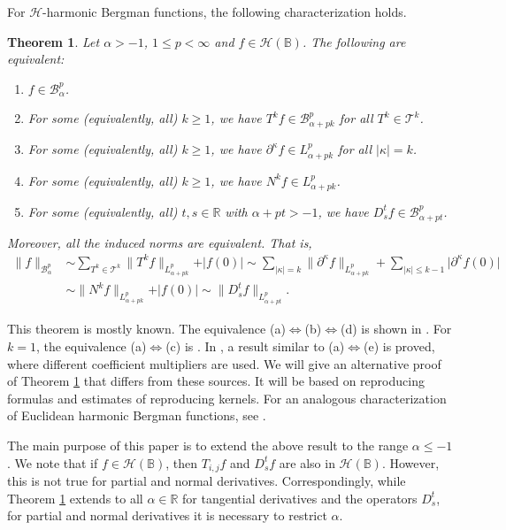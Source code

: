 \documentclass{amsart}
\newtheorem{theorem}{Theorem}[section]
\theoremstyle{definition}
\theoremstyle{remark}
\begin{document}
For $\mathcal H$-harmonic Bergman functions, the following characterization holds.

\begin{theorem}\label{TBergman}
Let $\alpha>-1$, $1\le p<\infty$ and $f\in\mathcal H(\mathbb B)$.
The following are equivalent:
\begin{enumerate}
  \item[(a)] $f\in \mathcal B^p_\alpha$.
  \item[(b)] For some (equivalently, all) $k\ge 1$, we have
  $T^k f\in \mathcal B^p_{\alpha+pk}$ for all $T^k\in\mathcal T^k$.
  \item[(c)] For some (equivalently, all) $k\ge 1$, we have
  $\partial^\kappa f\in L^p_{\alpha+pk}$ for all
  $\vert\kappa\vert=k$.
  \item[(d)] For some (equivalently, all) $k\ge 1$, we have
  $N^k f\in L^p_{\alpha+pk}$.
  \item[(e)] For some (equivalently, all) $t,s\in\mathbb R$ with $\alpha+pt>-1$,
  we have $D^t_s f\in \mathcal B^p_{\alpha+pt}$.
\end{enumerate}
Moreover, all the induced norms are equivalent.
That is,
\begin{align*}
\|f\|_{\mathcal B^p_\alpha}
&\sim \sum_{T^k\in\mathcal T^k} \|T^k f\|_{L^p_{\alpha+pk}}+\vert f(0)\vert
\sim \sum_{\vert\kappa\vert=k} \|\partial^\kappa f\|_{L^p_{\alpha+pk}}
     +\sum_{\vert\kappa\vert\le k-1} \vert\partial^\kappa f(0)\vert\\
&\sim \|N^k f\|_{L^p_{\alpha+pk}}+\vert f(0)\vert
\sim \|D^t_s f\|_{L^p_{\alpha+pt}}.
\end{align*}
\end{theorem}

This theorem is mostly known.
The equivalence (a)$\Leftrightarrow$(b)$\Leftrightarrow$(d) is shown
in \cite[Theorem 1.2]{J}.
For $k=1$, the equivalence (a)$\Leftrightarrow$(c) is \cite[Theorem 10.3.3]{St1}.
In \cite{RKSL}, a result similar to (a)$\Leftrightarrow$(e) is proved,
where different coefficient multipliers are used.
We will give an alternative proof of Theorem \ref{TBergman} that differs
from these sources.
It will be based on reproducing formulas and estimates of reproducing kernels.
For an analogous characterization of Euclidean harmonic Bergman functions,
see \cite{CKY}.

The main purpose of this paper is to extend the above result to
the range $\alpha\le -1$.
We note that if $f\in\mathcal H(\mathbb B)$, then $T_{i,j}f$ and $D^t_s f$ are also
in $\mathcal H(\mathbb B)$.
However, this is not true for partial and normal derivatives.
Correspondingly, while Theorem \ref{TBergman} extends to all
$\alpha\in\mathbb R$ for tangential derivatives and the operators $D^t_s$,
for partial and normal derivatives it is necessary to restrict $\alpha$.
\end{document}
